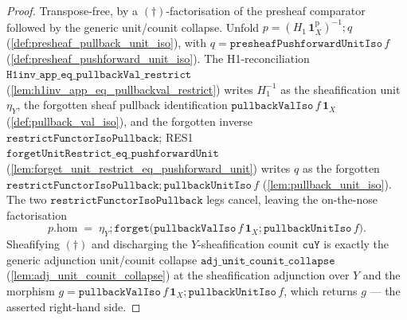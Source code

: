 \begin{proof}
  \leanok
  Transpose-free, by a \((\dagger)\)-factorisation of the presheaf comparator followed by the generic
  unit/counit collapse. Unfold \(p = (H_1\,\mathbf 1^{\mathrm p}_X)^{-1} \mathbin{;} q\)
  (\cref{def:presheaf_pullback_unit_iso}), with \(q = \mathtt{presheafPushforwardUnitIso}\,f\)
  (\cref{def:presheaf_pushforward_unit_iso}). The H1-reconciliation
  \(\mathtt{H1inv\_app\_eq\_pullbackVal\_restrict}\)
  (\cref{lem:h1inv_app_eq_pullbackval_restrict}) writes \(H_1^{-1}\) as the sheafification unit
  \(\eta_Y\), the forgotten sheaf pullback identification \(\mathtt{pullbackValIso}\,f\,\mathbf 1_X\)
  (\cref{def:pullback_val_iso}), and the forgotten inverse \(\mathtt{restrictFunctorIsoPullback}\);
  RES1 \(\mathtt{forgetUnitRestrict\_eq\_pushforwardUnit}\)
  (\cref{lem:forget_unit_restrict_eq_pushforward_unit}) writes \(q\) as the forgotten
  \(\mathtt{restrictFunctorIsoPullback} \mathbin{;} \mathtt{pullbackUnitIso}\,f\)
  (\cref{lem:pullback_unit_iso}). The two \(\mathtt{restrictFunctorIsoPullback}\) legs cancel, leaving
  the on-the-nose factorisation
  \[
    p.\mathrm{hom} \;=\; \eta_Y \mathbin{;}
      \mathtt{forget}\bigl(\mathtt{pullbackValIso}\,f\,\mathbf 1_X
        \mathbin{;} \mathtt{pullbackUnitIso}\,f\bigr).
    \tag{$\dagger$}
  \]
  Sheafifying \((\dagger)\) and discharging the \(Y\)-sheafification counit \(\mathtt{cuY}\) is exactly
  the generic adjunction unit/counit collapse \(\mathtt{adj\_unit\_counit\_collapse}\)
  (\cref{lem:adj_unit_counit_collapse}) at the sheafification adjunction over \(Y\) and the morphism
  \(g = \mathtt{pullbackValIso}\,f\,\mathbf 1_X \mathbin{;} \mathtt{pullbackUnitIso}\,f\), which returns
  \(g\) --- the asserted right-hand side.
\end{proof}

